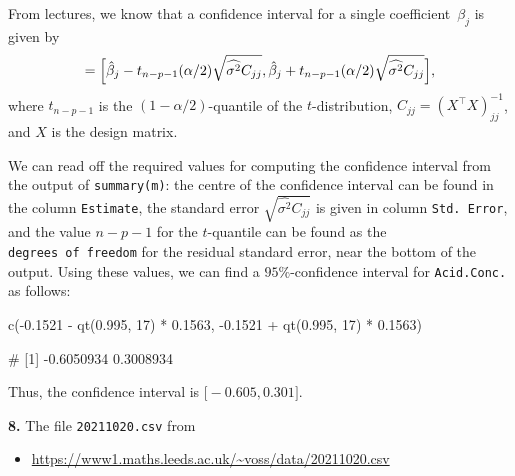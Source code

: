 \documentclass[
  a4paper,
]{article}
\newenvironment{Shaded}{\begin{snugshade}}{\end{snugshade}}
\newcommand{\DecValTok}[1]{\textcolor[rgb]{0.00,0.00,0.81}{#1}}
\newcommand{\FloatTok}[1]{\textcolor[rgb]{0.00,0.00,0.81}{#1}}
\newcommand{\FunctionTok}[1]{\textcolor[rgb]{0.00,0.00,0.00}{#1}}
\newcommand{\NormalTok}[1]{#1}
\newcommand{\SpecialCharTok}[1]{\textcolor[rgb]{0.00,0.00,0.00}{#1}}
\providecommand{\tightlist}{%
  \setlength{\itemsep}{0pt}\setlength{\parskip}{0pt}}
\theoremstyle{definition}
\theoremstyle{definition}
\theoremstyle{definition}
\theoremstyle{definition}
\theoremstyle{remark}
\begin{document}
\begin{myanswers}
From lectures, we know that a confidence interval for a single
coefficient~\(\beta_j\) is given by
\begin{equation*}
  [U, V]
  = \Bigl[ \hat\beta_j - t_{n-p-1}(\alpha/2) \sqrt{\widehat{\sigma^2} C_{jj}},
        \hat\beta_j + t_{n-p-1}(\alpha/2) \sqrt{\widehat{\sigma^2} C_{jj}} \Bigr],
\end{equation*}
where \(t_{n-p-1}\) is the \((1-\alpha/2)\)-quantile of the \(t\)-distribution,
\(C_{jj} = (X^\top X)^{-1}_{jj}\), and \(X\) is the design matrix.

We can read off the required values for computing the confidence
interval from the output of \texttt{summary(m)}: the centre of the
confidence interval can be found in the column \texttt{Estimate}, the
standard error \(\sqrt{\widehat{\sigma^2} C_{jj}}\) is given in column
\texttt{Std.\ Error}, and the value \(n-p-1\) for the \(t\)-quantile can be
found as the \texttt{degrees\ of\ freedom} for the residual standard error,
near the bottom of the output. Using these values, we can find a
\(95\%\)-confidence interval for \texttt{Acid.Conc.} as
follows:

\begin{Shaded}
\begin{Highlighting}[]
\FunctionTok{c}\NormalTok{(}\SpecialCharTok{{-}}\FloatTok{0.1521} \SpecialCharTok{{-}} \FunctionTok{qt}\NormalTok{(}\FloatTok{0.995}\NormalTok{, }\DecValTok{17}\NormalTok{) }\SpecialCharTok{*} \FloatTok{0.1563}\NormalTok{, }\SpecialCharTok{{-}}\FloatTok{0.1521} \SpecialCharTok{+} \FunctionTok{qt}\NormalTok{(}\FloatTok{0.995}\NormalTok{, }\DecValTok{17}\NormalTok{) }\SpecialCharTok{*} \FloatTok{0.1563}\NormalTok{)}
\end{Highlighting}
\end{Shaded}

\begin{Shaded}
\begin{Highlighting}[]
\NormalTok{\# [1] {-}0.6050934  0.3008934}
\end{Highlighting}
\end{Shaded}

Thus, the confidence interval is \(\bigl[ -0.605, 0.301 \bigr]\).

\end{myanswers}

\textbf{8.} The file \texttt{20211020.csv} from

\begin{itemize}
\tightlist
\item
  \url{https://www1.maths.leeds.ac.uk/~voss/data/20211020.csv}
\end{itemize}
\end{document}
